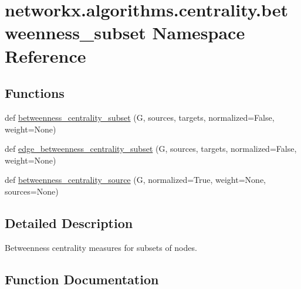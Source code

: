 \hypertarget{namespacenetworkx_1_1algorithms_1_1centrality_1_1betweenness__subset}{}\section{networkx.\+algorithms.\+centrality.\+betweenness\+\_\+subset Namespace Reference}
\label{namespacenetworkx_1_1algorithms_1_1centrality_1_1betweenness__subset}
\subsection*{Functions}
\begin{DoxyCompactItemize}
\item 
def \hyperlink{namespacenetworkx_1_1algorithms_1_1centrality_1_1betweenness__subset_a31c9a70b652f71393eb4c0602c41c230}{betweenness\+\_\+centrality\+\_\+subset} (G, sources, targets, normalized=False, weight=None)
\item 
def \hyperlink{namespacenetworkx_1_1algorithms_1_1centrality_1_1betweenness__subset_a57ae25aac4699c40e82a79de34127e2b}{edge\+\_\+betweenness\+\_\+centrality\+\_\+subset} (G, sources, targets, normalized=False, weight=None)
\item 
def \hyperlink{namespacenetworkx_1_1algorithms_1_1centrality_1_1betweenness__subset_a314fc9f110212adec60a92c7dd7db810}{betweenness\+\_\+centrality\+\_\+source} (G, normalized=True, weight=None, sources=None)
\end{DoxyCompactItemize}


\subsection{Detailed Description}
\begin{DoxyVerb}Betweenness centrality measures for subsets of nodes.\end{DoxyVerb}
 

\subsection{Function Documentation}
\mbox{\label{namespacenetworkx_1_1algorithms_1_1centrality_1_1betweenness__subset_a314fc9f110212adec60a92c7dd7db810}} 
